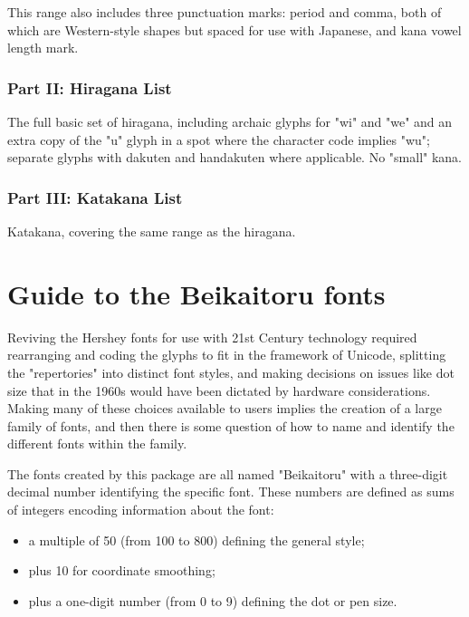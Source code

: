 \documentclass{article}
\begin{document}
This range also includes three punctuation marks:  period and comma, both of
which are Western-style shapes but spaced for use with Japanese, and kana
vowel length mark.

\subsubsection*{Part II: Hiragana List}

The full basic set of hiragana, including archaic glyphs for "wi" and "we"
and an extra copy of the "u" glyph in a spot where the character code
implies "wu"; separate glyphs with dakuten and handakuten where applicable. 
No "small" kana.  

\subsubsection*{Part III: Katakana List}

Katakana, covering the same range as the hiragana.


\section{Guide to the Beikaitoru fonts}

Reviving the Hershey fonts for use with 21st Century technology required
rearranging and coding the glyphs to fit in the framework of Unicode,
splitting the "repertories" into distinct font styles, and making decisions
on issues like dot size that in the 1960s would have been dictated by
hardware considerations.  Making many of these choices available to users
implies the creation of a large family of fonts, and then there is some
question of how to name and identify the different fonts within the family.

The fonts created by this package are all named "Beikaitoru" with a
three-digit decimal number identifying the specific font.  These numbers are
defined as sums of integers encoding information about the font:
\begin{itemize}
   \item a multiple of 50 (from 100 to 800) defining the general style;
   \item plus 10 for coordinate smoothing;
   \item plus a one-digit number (from 0 to 9) defining the dot or pen size.
\end{itemize}
\end{document}
